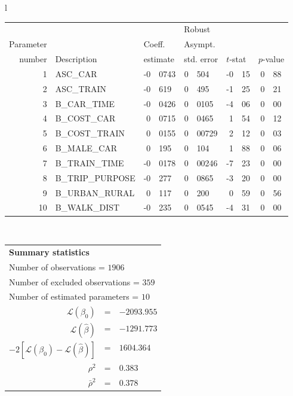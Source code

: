   \begin{tabular}{l}
\begin{tabular}{rlr@{.}lr@{.}lr@{.}lr@{.}l}
         &                       &   \multicolumn{2}{l}{}    & \multicolumn{2}{l}{Robust}  &     \multicolumn{4}{l}{}   \\
Parameter &                       &   \multicolumn{2}{l}{Coeff.}      & \multicolumn{2}{l}{Asympt.}  &     \multicolumn{4}{l}{}   \\
number &  Description                     &   \multicolumn{2}{l}{estimate}      & \multicolumn{2}{l}{std. error}  &   \multicolumn{2}{l}{$t$-stat}  &   \multicolumn{2}{l}{$p$-value}   \\

\hline

1 & ASC_CAR & -0&0743 & 0&504 & -0&15 & 0&88\\
2 & ASC_TRAIN & -0&619 & 0&495 & -1&25 & 0&21\\
3 & B_CAR_TIME & -0&0426 & 0&0105 & -4&06 & 0&00\\
4 & B_COST_CAR & 0&0715 & 0&0465 & 1&54 & 0&12\\
5 & B_COST_TRAIN & 0&0155 & 0&00729 & 2&12 & 0&03\\
6 & B_MALE_CAR & 0&195 & 0&104 & 1&88 & 0&06\\
7 & B_TRAIN_TIME & -0&0178 & 0&00246 & -7&23 & 0&00\\
8 & B_TRIP_PURPOSE & -0&277 & 0&0865 & -3&20 & 0&00\\
9 & B_URBAN_RURAL & 0&117 & 0&200 & 0&59 & 0&56\\
10 & B_WALK_DIST & -0&235 & 0&0545 & -4&31 & 0&00\\
\hline
\end{tabular}
\\
\begin{tabular}{rcl}
\multicolumn{3}{l}{\bf Summary statistics}\\
\multicolumn{3}{l}{ Number of observations = $1906$} \\
\multicolumn{3}{l}{ Number of excluded observations = $359$} \\
\multicolumn{3}{l}{ Number of estimated  parameters = $10$} \\
 $\mathcal{L}(\beta_0)$ &=&  $-2093.955$ \\
 $\mathcal{L}(\hat{\beta})$ &=& $-1291.773 $  \\
 $-2[\mathcal{L}(\beta_0) -\mathcal{L}(\hat{\beta})]$ &=& $1604.364$ \\
    $\rho^2$ &=&   $0.383$ \\
    $\bar{\rho}^2$ &=&    $0.378$ \\
\end{tabular}
  \end{tabular}
